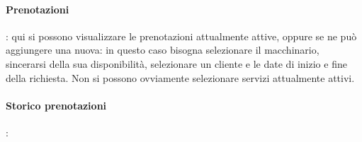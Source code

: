 \paragraph{Prenotazioni}: qui si possono visualizzare le prenotazioni attualmente attive, oppure se ne può aggiungere una nuova: in questo caso bisogna selezionare il macchinario, sincerarsi della sua disponibilità, selezionare un cliente e le date di inizio e fine della richiesta. Non si possono ovviamente selezionare servizi attualmente attivi.
\paragraph{Storico prenotazioni}: 







